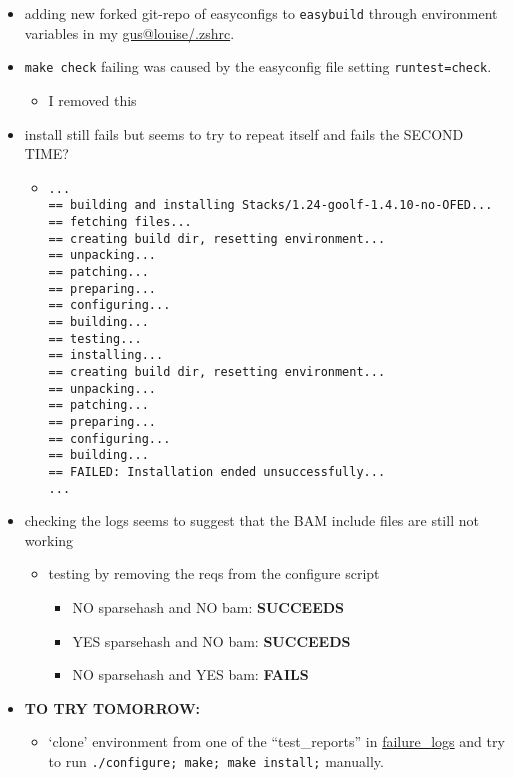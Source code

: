 \documentclass[letterpaper]{scrartcl}
\begin{document}
\begin{itemize}
\item
  adding new forked git-repo of easyconfigs to \texttt{easybuild}
  through environment variables in my
  \href{file:///home/gus/remote_mounts/louise/.zshrc}{gus@louise/.zshrc}.
\item
  \texttt{make check} failing was caused by the easyconfig file setting
  \texttt{runtest=\textquotesingle{}check\textquotesingle{}}.

  \begin{itemize}
  \itemsep1pt\parskip0pt
  \item
    I removed this
  \end{itemize}
\item
  install still fails but seems to try to repeat itself and fails the
  SECOND TIME?

  \begin{itemize}
  \item
\begin{verbatim}
...
== building and installing Stacks/1.24-goolf-1.4.10-no-OFED...
== fetching files...
== creating build dir, resetting environment...
== unpacking...
== patching...
== preparing...
== configuring...
== building...
== testing...
== installing...
== creating build dir, resetting environment...
== unpacking...
== patching...
== preparing...
== configuring...
== building...
== FAILED: Installation ended unsuccessfully...
...
\end{verbatim}
  \end{itemize}
\item
  checking the logs seems to suggest that the BAM include files are
  still not working

  \begin{itemize}
  \itemsep1pt\parskip0pt
  \item
    testing by removing the reqs from the configure script

    \begin{itemize}
    \itemsep1pt\parskip0pt
    \item
      NO sparsehash and NO bam: \textbf{SUCCEEDS}
    \item
      YES sparsehash and NO bam: \textbf{SUCCEEDS}
    \item
      NO sparsehash and YES bam: \textbf{FAILS}
    \end{itemize}
  \end{itemize}
\item
  \textbf{TO TRY TOMORROW:}

  \begin{itemize}
  \itemsep1pt\parskip0pt
  \item
    `clone' environment from one of the ``test\_reports'' in
    \href{file:///home/gus/remote_mounts/louise/scripts/installs/easybuild/failure_logs/}{failure\_logs}
    and try to run \texttt{./configure; make; make install;} manually.
  \end{itemize}
\end{itemize}
\end{document}
